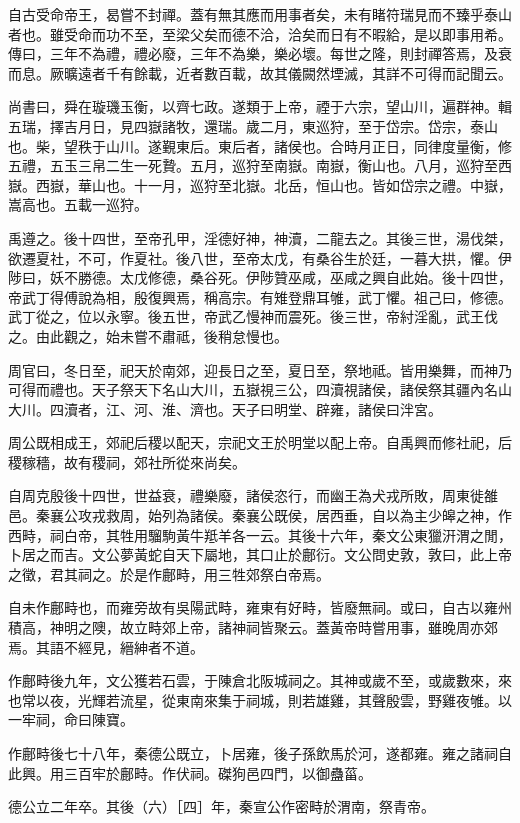 自古受命帝王，曷嘗不封禪。蓋有無其應而用事者矣，未有睹符瑞見而不臻乎泰山者也。雖受命而功不至，至梁父矣而德不洽，洽矣而日有不暇給，是以即事用希。傳曰，三年不為禮，禮必廢，三年不為樂，樂必壞。每世之隆，則封禪答焉，及衰而息。厥曠遠者千有餘載，近者數百載，故其儀闕然堙滅，其詳不可得而記聞云。

尚書曰，舜在璇璣玉衡，以齊七政。遂類于上帝，禋于六宗，望山川，遍群神。輯五瑞，擇吉月日，見四嶽諸牧，還瑞。歲二月，東巡狩，至于岱宗。岱宗，泰山也。柴，望秩于山川。遂覲東后。東后者，諸侯也。合時月正日，同律度量衡，修五禮，五玉三帛二生一死贄。五月，巡狩至南嶽。南嶽，衡山也。八月，巡狩至西嶽。西嶽，華山也。十一月，巡狩至北嶽。北岳，恒山也。皆如岱宗之禮。中嶽，嵩高也。五載一巡狩。

禹遵之。後十四世，至帝孔甲，淫德好神，神瀆，二龍去之。其後三世，湯伐桀，欲遷夏社，不可，作夏社。後八世，至帝太戊，有桑谷生於廷，一暮大拱，懼。伊陟曰，妖不勝德。太戊修德，桑谷死。伊陟贊巫咸，巫咸之興自此始。後十四世，帝武丁得傅說為相，殷復興焉，稱高宗。有雉登鼎耳雊，武丁懼。祖己曰，修德。武丁從之，位以永寧。後五世，帝武乙慢神而震死。後三世，帝紂淫亂，武王伐之。由此觀之，始未嘗不肅祗，後稍怠慢也。

周官曰，冬日至，祀天於南郊，迎長日之至，夏日至，祭地祗。皆用樂舞，而神乃可得而禮也。天子祭天下名山大川，五嶽視三公，四瀆視諸侯，諸侯祭其疆內名山大川。四瀆者，江、河、淮、濟也。天子曰明堂、辟雍，諸侯曰泮宮。

周公既相成王，郊祀后稷以配天，宗祀文王於明堂以配上帝。自禹興而修社祀，后稷稼穡，故有稷祠，郊社所從來尚矣。

自周克殷後十四世，世益衰，禮樂廢，諸侯恣行，而幽王為犬戎所敗，周東徙雒邑。秦襄公攻戎救周，始列為諸侯。秦襄公既侯，居西垂，自以為主少皞之神，作西畤，祠白帝，其牲用騮駒黃牛羝羊各一云。其後十六年，秦文公東獵汧渭之閒，卜居之而吉。文公夢黃蛇自天下屬地，其口止於鄜衍。文公問史敦，敦曰，此上帝之徵，君其祠之。於是作鄜畤，用三牲郊祭白帝焉。

自未作鄜畤也，而雍旁故有吳陽武畤，雍東有好畤，皆廢無祠。或曰，自古以雍州積高，神明之隩，故立畤郊上帝，諸神祠皆聚云。蓋黃帝時嘗用事，雖晚周亦郊焉。其語不經見，縉紳者不道。

作鄜畤後九年，文公獲若石雲，于陳倉北阪城祠之。其神或歲不至，或歲數來，來也常以夜，光輝若流星，從東南來集于祠城，則若雄雞，其聲殷雲，野雞夜雊。以一牢祠，命曰陳寶。

作鄜畤後七十八年，秦德公既立，卜居雍，後子孫飲馬於河，遂都雍。雍之諸祠自此興。用三百牢於鄜畤。作伏祠。磔狗邑四門，以御蠱菑。

德公立二年卒。其後（六）［四］年，秦宣公作密畤於渭南，祭青帝。

